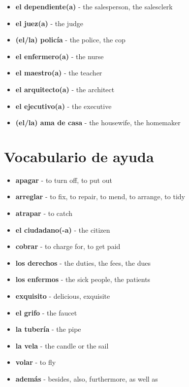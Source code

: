\documentclass[12pt]{article}
\begin{document}
\begin{itemize}
            \item \textbf{el dependiente(a)} - the salesperson, the salesclerk
            \item \textbf{el juez(a)} - the judge
            \item \textbf{(el/la) policía} - the police, the cop
            \item \textbf{el enfermero(a)} - the nurse
            \item \textbf{el maestro(a)} - the teacher
            \item \textbf{el arquitecto(a)} - the architect
            \item \textbf{el ejecutivo(a)} - the executive
            \item \textbf{(el/la) ama de casa} - the housewife, the homemaker
        \end{itemize}

    \section{Vocabulario de ayuda}
        \begin{itemize}
            \item \textbf{apagar} - to turn off, to put out
            \item \textbf{arreglar} - to fix, to repair, to mend, to arrange, to tidy
            \item \textbf{atrapar} - to catch
            \item \textbf{el ciudadano(-a)} - the citizen
            \item \textbf{cobrar} - to charge for, to get paid
            \item \textbf{los derechos} - the duties, the fees, the dues
            \item \textbf{los enfermos} - the sick people, the patients
            \item \textbf{exquisito} - delicious, exquisite
            \item \textbf{el grifo} - the faucet
            \item \textbf{la tubería} - the pipe
            \item \textbf{la vela} - the candle or the sail
            \item \textbf{volar} - to fly
            \item \textbf{además} - besides, also, furthermore, as well as
        \end{itemize}
\end{document}
